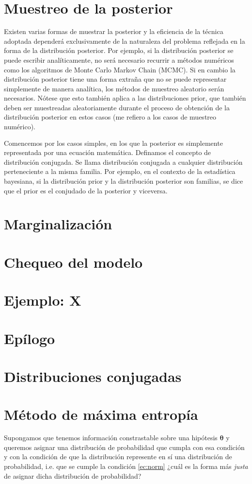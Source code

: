 \documentclass[a4paper,twoside]{article}
\newcommand{\hip}{\ensuremath{\bm{\theta}}\xspace}
\begin{document}
\section{Muestreo de la posterior}
%
Existen varias formas de muestrar la posterior y la eficiencia de la técnica adoptada dependerá
exclusivamente de la naturaleza del problema reflejada en la forma de la distribución posterior. Por
ejemplo, si la distribución posterior se puede escribir analíticamente, no será necesario recurrir a
métodos numéricos como los algoritmos de Monte Carlo Markov Chain (MCMC). Si en cambio la
distribución posterior tiene una forma extraña que no se puede representar simplemente de manera
analítica, los métodos de muestreo aleatorio serán necesarios. Nótese que esto también aplica a las
distribuciones prior, que también deben ser muestreadas aleatoriamente durante el proceso de
obtención de la distribución posterior en estos casos (me refiero a los casos de muestreo numérico).

Comencemos por los casos simples, en los que la posterior es simplemente representada por una
ecuación matemática. Definamos el concepto de distribución conjugada. Se llama distribución
conjugada a cualquier distribución perteneciente a la misma familia. Por ejemplo, en el contexto de
la estadística bayesiana, si la distribución prior y la distribución posterior son familias, se dice
que el prior es el conjudado de la posterior y viceversa.

\section{Marginalización}

\section{Chequeo del modelo}

\section{Ejemplo: X}

\section{Epílogo}

\appendix

\section{Distribuciones conjugadas}\label{sc:conjugate-pdf}

\section{Método de máxima entropía}\label{sc:me-method}

Supongamos que tenemos información constrastable sobre una hipótesis $\hip$ y queremos asignar una
distribución de probabilidad que cumpla con esa condición y con la condición de que la distribución
represente en sí una distribución de probabilidad, i.e. que se cumple la condición \eqref{ec:norm}
¿cuál es la forma más \emph{justa} de asignar dicha distribución de probabilidad?
\end{document}
